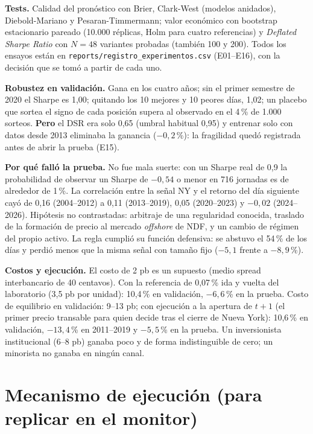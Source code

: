 \documentclass[11pt,a4paper]{article}
\begin{document}
\textbf{Tests.} Calidad del pronóstico con Brier, Clark-West (modelos anidados), Diebold-Mariano y Pesaran-Timmermann; valor económico con bootstrap estacionario pareado (10.000 réplicas, Holm para cuatro referencias) y \emph{Deflated Sharpe Ratio} con $N=48$ variantes probadas (también 100 y 200). Todos los ensayos están en \texttt{reports/registro\_experimentos.csv} (E01--E16), con la decisión que se tomó a partir de cada uno.

\textbf{Robustez en validación.} Gana en los cuatro años; sin el primer semestre de 2020 el Sharpe es 1,00; quitando los 10 mejores y 10 peores días, 1,02; un placebo que sortea el signo de cada posición supera al observado en el 4\,\% de 1.000 sorteos. \textbf{Pero} el DSR era solo 0,65 (umbral habitual 0,95) y entrenar solo con datos desde 2013 eliminaba la ganancia ($-0{,}2$\,\%): la fragilidad quedó registrada antes de abrir la prueba (E15).

\textbf{Por qué falló la prueba.} No fue mala suerte: con un Sharpe real de 0,9 la probabilidad de observar un Sharpe de $-0{,}54$ o menor en 716 jornadas es de alrededor de 1\,\%. La correlación entre la señal NY y el retorno del día siguiente cayó de 0,16 (2004--2012) a 0,11 (2013--2019), 0,05 (2020--2023) y $-0{,}02$ (2024--2026). Hipótesis no contrastadas: arbitraje de una regularidad conocida, traslado de la formación de precio al mercado \emph{offshore} de NDF, y un cambio de régimen del propio activo. La regla cumplió su función defensiva: se abstuvo el 54\,\% de los días y perdió menos que la misma señal con tamaño fijo ($-5{,}1$ frente a $-8{,}9$\,\%).

\textbf{Costos y ejecución.} El costo de 2 pb es un supuesto (medio spread interbancario de 40 centavos). Con la referencia de 0,07\,\% ida y vuelta del laboratorio (3,5 pb por unidad): 10,4\,\% en validación, $-6{,}6$\,\% en la prueba. Costo de equilibrio en validación: 9--13 pb; con ejecución a la apertura de $t+1$ (el primer precio transable para quien decide tras el cierre de Nueva York): 10,6\,\% en validación, $-13{,}4$\,\% en 2011--2019 y $-5{,}5$\,\% en la prueba. Un inversionista institucional (6--8 pb) ganaba poco y de forma indistinguible de cero; un minorista no ganaba en ningún canal.

\section{Mecanismo de ejecución (para replicar en el monitor)}
\end{document}
